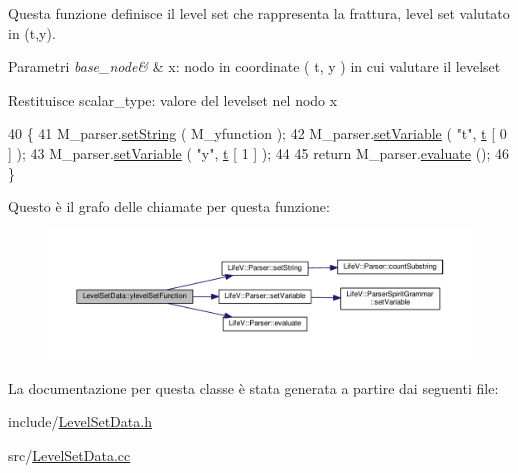 Questa funzione definisce il level set che rappresenta la frattura, level set valutato in (t,y). 


\begin{DoxyParams}{Parametri}
{\em base\-\_\-node\&} & x\-: nodo in coordinate ( t, y ) in cui valutare il levelset \\
\hline
\end{DoxyParams}
\begin{DoxyReturn}{Restituisce}
scalar\-\_\-type\-: valore del levelset nel nodo x 
\end{DoxyReturn}

\begin{DoxyCode}
40 \{
41     M\_parser.\hyperlink{classLifeV_1_1Parser_ac05769e836a0dc95d9c020df361a5194}{setString} ( M\_yfunction );
42     M\_parser.\hyperlink{classLifeV_1_1Parser_aa2b362e12b8feb60231705d499c9fbae}{setVariable} ( \textcolor{stringliteral}{"t"}, \hyperlink{discontinuo_8m_aaccc9105df5383111407fd5b41255e23}{t} [ 0 ] );
43     M\_parser.\hyperlink{classLifeV_1_1Parser_aa2b362e12b8feb60231705d499c9fbae}{setVariable} ( \textcolor{stringliteral}{"y"}, \hyperlink{discontinuo_8m_aaccc9105df5383111407fd5b41255e23}{t} [ 1 ] );
44 
45     \textcolor{keywordflow}{return} M\_parser.\hyperlink{classLifeV_1_1Parser_a51d84fd4ae6d420620e7beee58fad673}{evaluate} ();
46 \}
\end{DoxyCode}


Questo è il grafo delle chiamate per questa funzione\-:
\nopagebreak
\begin{figure}[H]
\begin{center}
\leavevmode
\includegraphics[width=350pt]{classLevelSetData_a732ae59581206d4f94237e54bc0071e3_cgraph}
\end{center}
\end{figure}




La documentazione per questa classe è stata generata a partire dai seguenti file\-:\begin{DoxyCompactItemize}
\item 
include/\hyperlink{LevelSetData_8h}{Level\-Set\-Data.\-h}\item 
src/\hyperlink{LevelSetData_8cc}{Level\-Set\-Data.\-cc}\end{DoxyCompactItemize}

